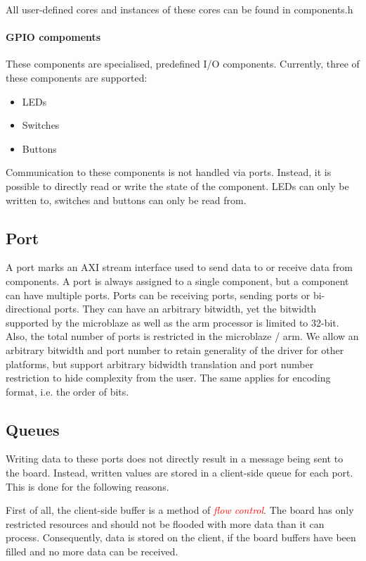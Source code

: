 \documentclass{report}
\begin{document}
All user-defined cores and instances of these cores can be found in components.h

\paragraph{GPIO compoments}
These components are specialised, predefined I/O components. Currently, three of these components are supported:
\begin{itemize} \itemsep1pt \parskip0pt 
\item LEDs
\item Switches
\item Buttons
\end{itemize}
Communication to these components is not handled via ports. Instead, it is possible to directly read or write the state of the component. LEDs can only be written to, switches and buttons can only be read from.

\subsection{Port}
 A port marks an AXI stream interface used to send data to or receive data from components. A port is always assigned to a single component, but a component can have multiple ports. Ports can be receiving ports, sending ports or bi-directional ports. They can have an arbitrary bitwidth, yet the bitwidth supported by the microblaze as well as the arm processor is limited to 32-bit. Also, the total number of ports is restricted in the microblaze / arm. We allow an arbitrary bitwidth and port number to retain generality of the driver for other platforms, but support arbitrary bidwidth translation and port number restriction to hide complexity from the user. The same applies for encoding format, i.e. the order of bits.

\subsection{Queues}
Writing data to these ports does not directly result in a message being sent to the board. Instead, written values are stored in a client-side queue for each port. This is done for the following reasons.

First of all, the client-side buffer is a method of \textcolor{red}{\textit{flow control}}. The board has only restricted resources and should not be flooded with more data than it can process. Consequently, data is stored on the client, if the board buffers have been filled and no more data can be received. 
\end{document}
